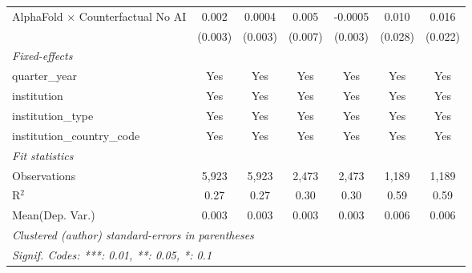 \begin{tabular}{lcccccc}
   AlphaFold $\times$ Counterfactual No AI  & 0.002   & 0.0004   & 0.005   & -0.0005 & 0.010   & 0.016\\   
                                            & (0.003) & (0.003)  & (0.007) & (0.003) & (0.028) & (0.022)\\   
   \midrule
   \emph{Fixed-effects}\\
   quarter\_year                            & Yes     & Yes      & Yes     & Yes     & Yes     & Yes\\  
   institution                              & Yes     & Yes      & Yes     & Yes     & Yes     & Yes\\  
   institution\_type                        & Yes     & Yes      & Yes     & Yes     & Yes     & Yes\\  
   institution\_country\_code               & Yes     & Yes      & Yes     & Yes     & Yes     & Yes\\  
   \midrule
   \emph{Fit statistics}\\
   Observations                             & 5,923   & 5,923    & 2,473   & 2,473   & 1,189   & 1,189\\  
   R$^2$                                    & 0.27    & 0.27     & 0.30    & 0.30    & 0.59    & 0.59\\  
Mean(Dep. Var.) & 0.003 & 0.003 & 0.003 & 0.003 & 0.006 & 0.006 \\
   \midrule \midrule
   \multicolumn{7}{l}{\emph{Clustered (author) standard-errors in parentheses}}\\
   \multicolumn{7}{l}{\emph{Signif. Codes: ***: 0.01, **: 0.05, *: 0.1}}\\
\end{tabular}
\par\endgroup
